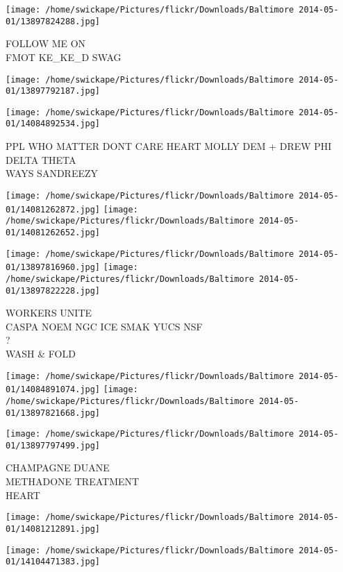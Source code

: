 \documentclass[10pt,letterpaper]{article}
\begin{document}
\vspace{0.25in}
\texttt{[image: /home/swickape/Pictures/flickr/Downloads/Baltimore 2014-05-01/13897824288.jpg]}

FOLLOW ME ON\\
FMOT KE\_KE\_D SWAG
\pagebreak

\texttt{[image: /home/swickape/Pictures/flickr/Downloads/Baltimore 2014-05-01/13897792187.jpg]}

\vspace{0.25in}
\texttt{[image: /home/swickape/Pictures/flickr/Downloads/Baltimore 2014-05-01/14084892534.jpg]}

PPL WHO MATTER DONT CARE HEART MOLLY DEM + DREW PHI DELTA THETA\\
WAYS SANDREEZY
\pagebreak

\texttt{[image: /home/swickape/Pictures/flickr/Downloads/Baltimore 2014-05-01/14081262872.jpg]}
\texttt{[image: /home/swickape/Pictures/flickr/Downloads/Baltimore 2014-05-01/14081262652.jpg]}

\texttt{[image: /home/swickape/Pictures/flickr/Downloads/Baltimore 2014-05-01/13897816960.jpg]}
\texttt{[image: /home/swickape/Pictures/flickr/Downloads/Baltimore 2014-05-01/13897822228.jpg]}

WORKERS UNITE\\
CASPA NOEM NGC ICE SMAK YUCS NSF\\
?\\
WASH \& FOLD
\pagebreak

\texttt{[image: /home/swickape/Pictures/flickr/Downloads/Baltimore 2014-05-01/14084891074.jpg]}
\texttt{[image: /home/swickape/Pictures/flickr/Downloads/Baltimore 2014-05-01/13897821668.jpg]}

\vspace{0.25in}
\texttt{[image: /home/swickape/Pictures/flickr/Downloads/Baltimore 2014-05-01/13897797499.jpg]}

CHAMPAGNE DUANE\\
METHADONE TREATMENT\\
HEART
\pagebreak

\texttt{[image: /home/swickape/Pictures/flickr/Downloads/Baltimore 2014-05-01/14081212891.jpg]}

\vspace{0.25in}
\texttt{[image: /home/swickape/Pictures/flickr/Downloads/Baltimore 2014-05-01/14104471383.jpg]}
\end{document}
